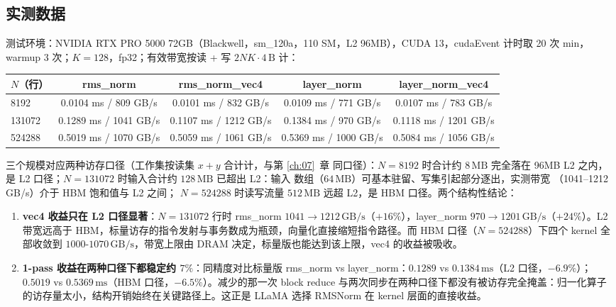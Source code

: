 \subsection{实测数据}

测试环境：NVIDIA RTX PRO 5000 72GB（Blackwell，sm\_120a，110 SM，L2 96MB），CUDA 13，cudaEvent 计时取 20 次 min，warmup 3 次；$K=128$，fp32；有效带宽按读 + 写 $2NK \cdot 4\,\mathrm{B}$ 计：

\begin{center}
\begin{tabular}{lcccc}
\toprule
$N$（行） & rms\_norm & rms\_norm\_vec4 & layer\_norm & layer\_norm\_vec4 \\
\midrule
8192   & 0.0104 ms / 809 GB/s  & 0.0101 ms / 832 GB/s  & 0.0109 ms / 771 GB/s  & 0.0107 ms / 783 GB/s \\
131072 & 0.1289 ms / 1041 GB/s & 0.1107 ms / 1212 GB/s & 0.1384 ms / 970 GB/s  & 0.1118 ms / 1201 GB/s \\
524288 & 0.5019 ms / 1070 GB/s & 0.5059 ms / 1061 GB/s & 0.5369 ms / 1000 GB/s & 0.5084 ms / 1056 GB/s \\
\bottomrule
\end{tabular}
\end{center}

三个规模对应两种访存口径（工作集按读集 $x+y$ 合计计，与第 \ref{ch:07}~章
同口径）：$N = 8192$ 时合计约 $8\,\mathrm{MB}$ 完全落在 96MB L2 之内，
是 L2 口径；$N = 131072$ 时输入合计约 $128\,\mathrm{MB}$ 已超出 L2：输入
数组（$64\,\mathrm{MB}$）可基本驻留、写集引起部分逐出，实测带宽
（1041--1212 GB/s）介于 HBM 饱和值与 L2 之间；
$N = 524288$ 时读写流量 $512\,\mathrm{MB}$ 远超 L2，是 HBM 口径。两个结构性结论：

\begin{enumerate}
  \item \textbf{vec4 收益只在 L2 口径显著}：$N = 131072$ 行时 rms\_norm $1041 \to 1212\,\mathrm{GB/s}$（$+16\%$），layer\_norm $970 \to 1201\,\mathrm{GB/s}$（$+24\%$）。L2 带宽远高于 HBM，标量访存的指令发射与事务数成为瓶颈，向量化直接缩短指令路径。而 HBM 口径（$N = 524288$）下四个 kernel 全部收敛到 $1000\text{-}1070\,\mathrm{GB/s}$，带宽上限由 DRAM 决定，标量版也能达到该上限，vec4 的收益被吸收。
  \item \textbf{1-pass 收益在两种口径下都稳定约 $7\%$}：同精度对比标量版 rms\_norm vs layer\_norm：$0.1289$ vs $0.1384\,\mathrm{ms}$（L2 口径，$-6.9\%$）；$0.5019$ vs $0.5369\,\mathrm{ms}$（HBM 口径，$-6.5\%$）。减少的那一次 block reduce 与两次同步在两种口径下都没有被访存完全掩盖：归一化算子的访存量太小，结构开销始终在关键路径上。这正是 LLaMA 选择 RMSNorm 在 kernel 层面的直接收益。
\end{enumerate}

